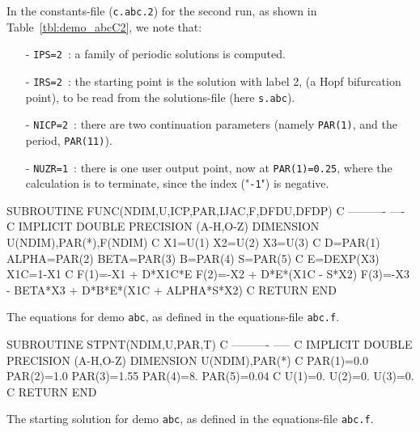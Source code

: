 \documentclass[12pt]{report}
\begin{document}
In the constants-file ({\tt c.abc.2}) for the second run, as shown in 
Table~\ref{tbl:demo_abcC2}, we note that:

\begin{itemize}
\item[-] {\tt IPS=2}~: a family of periodic solutions is computed.

\item[-] {\tt IRS=2}~: the starting point is the solution with label 2,
         (a Hopf bifurcation point), to be read from the solutions-file 
	 (here {\tt s.abc}).

\item[-] {\tt NICP=2}~: there are two continuation parameters
	 (namely {\tt PAR(1)}, and the period, {\tt PAR(11)}). 

\item[-] {\tt NUZR=1}~: there is one user output point, now at
	 {\tt PAR(1)=0.25}, where the calculation is to terminate,
	 since the index ("{\tt -1}") is negative.
\end{itemize}

\begin{table}[htbp]
{\small
\begin{center}
\begin{boxedverbatim}
      SUBROUTINE FUNC(NDIM,U,ICP,PAR,IJAC,F,DFDU,DFDP)
C     ---------- ----
C
      IMPLICIT DOUBLE PRECISION (A-H,O-Z)
      DIMENSION U(NDIM),PAR(*),F(NDIM)
C
       X1=U(1)
       X2=U(2)
       X3=U(3)
C
       D=PAR(1)
       ALPHA=PAR(2)
       BETA=PAR(3)
       B=PAR(4)
       S=PAR(5)
C
       E=DEXP(X3)
       X1C=1-X1
C
       F(1)=-X1 + D*X1C*E
       F(2)=-X2 + D*E*(X1C - S*X2)
       F(3)=-X3 - BETA*X3 + D*B*E*(X1C + ALPHA*S*X2)
C
      RETURN
      END
\end{boxedverbatim}
\end{center}
}
\caption{The equations for demo {\tt abc}, 
as defined in the equations-file {\tt abc.f}.}
\label{tbl:demo_abcE1}
\end{table}


\begin{table}[htbp]
{\small
\begin{center}
\begin{boxedverbatim}
      SUBROUTINE STPNT(NDIM,U,PAR,T)
C     ---------- -----
C
      IMPLICIT DOUBLE PRECISION (A-H,O-Z)
      DIMENSION U(NDIM),PAR(*)
C
       PAR(1)=0.0
       PAR(2)=1.0
       PAR(3)=1.55
       PAR(4)=8.
       PAR(5)=0.04
C
       U(1)=0.
       U(2)=0.
       U(3)=0.
C
      RETURN
      END
\end{boxedverbatim}
\end{center}
}
\caption{The starting solution for demo {\tt abc}, 
as defined in the equations-file {\tt abc.f}.}
\label{tbl:demo_abcE2}
\end{table}
\end{document}
